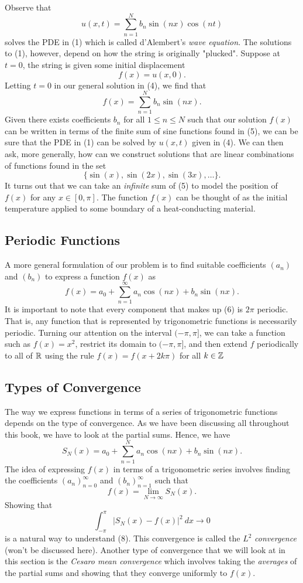 Observe that 
\[  u(x,t) = \sum_{ n=1 }^{ N } b_{n} \sin(nx) \cos(nt) \tag{4} \] solves the PDE in (1) which is called d'Alembert's \textit{wave equation}. The solutions to (1), however, depend on how the string is originally "plucked". Suppose at \( t = 0  \), the string is given some initial displacement 
\[  f(x) = u(x,0) .\] Letting \( t = 0  \) in our general solution in (4), we find that 
\[  f(x) = \sum_{ n=1 }^{ N } b_{n} \sin(nx).  \tag{5}\] 
Given there exists coefficients \( b_{n}   \) for all \( 1 \leq n \leq N \) such that our solution \( f(x) \) can be written in terms of the finite sum of sine functions found in  (5), we can be sure that the PDE in (1) can be solved by \( u(x,t)  \) given in (4). We can then ask, more generally, how can we construct solutions that are linear combinations of functions found in the set 
\[  \{  \sin(x), \sin(2x), \sin(3x), \dots \} . \] It turns out that we can take an \textit{infinite} sum of (5) to model the position of \( f(x)  \) for any \( x \in [0, \pi] \). The function \( f(x) \) can be thought of as the initial temperature applied to some boundary of a heat-conducting material.


\subsection{Periodic Functions}
A more general formulation of our problem is to find suitable coefficients \( (a_{n}) \) and \( (b_{n}) \) to express a function \( f(x)  \) as 
\[  f(x) = a_{0} + \sum_{ n=1 }^{ \infty  } a_{n} \cos(nx) + b_{n} \sin(nx). \tag{6} \] It is important to note that every component that makes up (6) is \( 2 \pi  \) periodic. That is, any function that is represented by trigonometric functions is necessarily periodic. Turning our attention on the interval \( (-\pi, \pi] \), we can take a function such as \( f(x) = x^{2} \), restrict its domain to \( (-\pi , \pi]  \), and then extend \( f  \) periodically to all of \( \mathbb{R}  \) using the rule \( f(x) = f(x+ 2 k \pi ) \) for all \( k \in \mathbb{Z} \)

\subsection{Types of Convergence}
The way we express functions in terms of a series of trigonometric functions depends on the type of convergence. As we have been discussing all throughout this book, we have to look at the partial sums. Hence, we have 
\[  S_{N}(x) = a_{0} + \sum_{ n=1 }^{ N } a_{n} \cos(nx) + b_{n } \sin(nx). \tag{7} \]
The idea of expressing \( f(x)  \) in terms of a trigonometric series involves finding the coefficients 
\( (a_{n})_{n=0}^{\infty } \) and \( (b_{n})_{n=1}^{\infty } \) such that  
\[  f(x) = \lim_{ N \to \infty  } S_{N}(x). \tag{8} \]
Showing that 
\[  \int_{ - \pi  }^{  \pi  } | S_{N}(x) - f(x)  |^{2} \ dx \to 0 \]
is a natural way to understand (8). This convergence is called the \( L^{2} \) \textit{convergence} (won't be discussed here). Another type of convergence that we will look at in this section is the \textit{Cesaro mean convergence} which involves taking the \textit{averages} of the partial sums and showing that they converge uniformly to \( f(x)  \).

